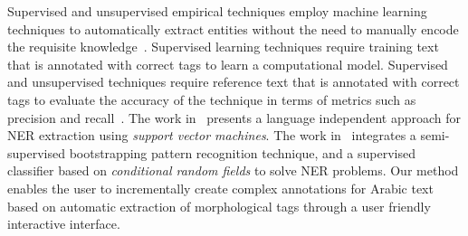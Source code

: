 Supervised and unsupervised empirical techniques employ machine learning techniques to 
automatically extract entities without the need to manually encode the requisite 
knowledge~\cite{soudi2007arabic}. 
Supervised learning techniques require training text that is annotated with correct tags to learn a computational model. 
Supervised and unsupervised techniques require reference text that is annotated with correct tags to evaluate the 
accuracy of the technique in terms of metrics such as precision and recall~\cite{englishtreebank,arabictreebank,chinesetreebank}. 
The work in~\cite{ekbal2010named} presents a language independent approach for NER extraction using {\em support vector machines}. 
The work in~\cite{abdelrahman2010integrated} integrates 
a semi-supervised bootstrapping pattern recognition technique, 
and a supervised classifier based on {\em conditional random fields}
to solve NER problems. 
Our method enables the user to incrementally create complex annotations for Arabic text based on automatic 
extraction of morphological tags through a user friendly interactive interface.

\subsection*{\framework}


